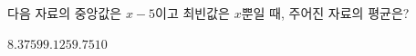 다음 자료의 중앙값은 $x-5$이고 최빈값은 $x$뿐일 때, 주어진 자료의 평균은?
\begin{choices32}{$8.375$}{$9$}{$9.125$}{$9.75$}{$10$}\end{choices32}
